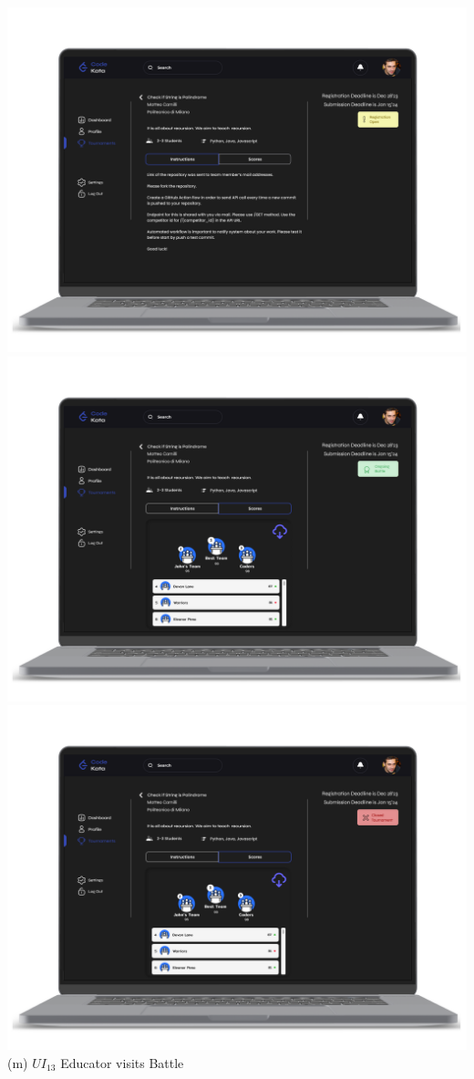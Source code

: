 \newpage
\begin{center}
\includegraphics[scale=0.13]{Images/ui-ux/educator_battle_1.png}
\includegraphics[scale=0.13]{Images/ui-ux/educator_battle_2.png}
\includegraphics[scale=0.13]{Images/ui-ux/educator_battle_3.png}
\\ (m) $UI_{13}$  Educator visits Battle
\end{center}
